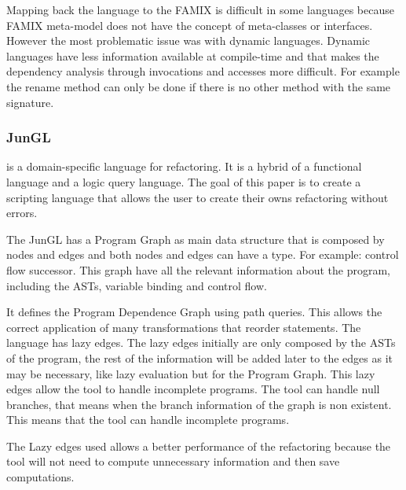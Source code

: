 Mapping back the language to the FAMIX is difficult in some languages because FAMIX meta-model does not have the concept of meta-classes or interfaces.
However the most problematic issue was with dynamic languages. 
Dynamic languages have less information available at compile-time and that makes the dependency analysis  through invocations and accesses more difficult. 
For example the rename method can only be done if there is no other method with the same signature.

\subsubsection{JunGL} %


\cite{verbaere2006jungl} is a domain-specific language for refactoring. 
It is a hybrid of a functional language and a logic query language. 
The goal of this paper is to create a scripting language that allows the user to create their owns refactoring without errors.

The JunGL has a Program Graph as main data structure that is composed by nodes and edges and both nodes and edges can have a type. 
For example: control flow successor. 
This graph have all the relevant information about the program, including the ASTs, variable binding and control flow.

It defines the Program Dependence Graph using path queries. 
This allows the correct application of many transformations that reorder statements.
The language has lazy edges. 
The lazy edges initially are only composed by the ASTs of the program, the rest of the information will be added later to the edges as it may be necessary, like lazy evaluation but for the Program Graph.
This lazy edges allow the tool to handle incomplete programs. 
The tool can handle null branches, that means when the branch information of the graph is non existent. This means that the tool can handle incomplete programs.


The Lazy edges used allows a better performance of the refactoring because the tool will not need to compute unnecessary information and then save computations.




